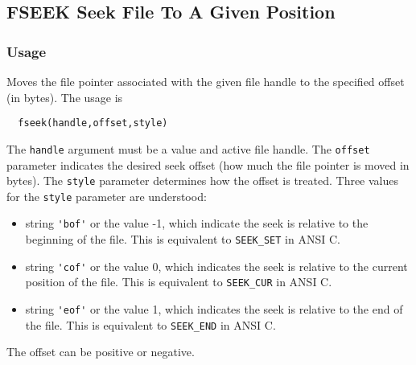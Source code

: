 %
%
%
\subsection{FSEEK Seek File To A Given Position}
\subsubsection{Usage}
Moves the file pointer associated with the given file handle to 
the specified offset (in bytes).  The usage is
\begin{verbatim}
  fseek(handle,offset,style)
\end{verbatim}
The \verb|handle| argument must be a value and active file handle.  The
\verb|offset| parameter indicates the desired seek offset (how much the
file pointer is moved in bytes).  The \verb|style| parameter determines
how the offset is treated.  Three values for the \verb|style| parameter
are understood:
\begin{itemize}
\item string \verb|'bof'| or the value -1, which indicate the seek is relative
to the beginning of the file.  This is equivalent to \verb|SEEK_SET| in
ANSI C.
\item string \verb|'cof'| or the value 0, which indicates the seek is relative
to the current position of the file.  This is equivalent to 
\verb|SEEK_CUR| in ANSI C.
\item string \verb|'eof'| or the value 1, which indicates the seek is relative
to the end of the file.  This is equivalent to \verb|SEEK_END| in ANSI
C.
\end{itemize}
The offset can be positive or negative.
